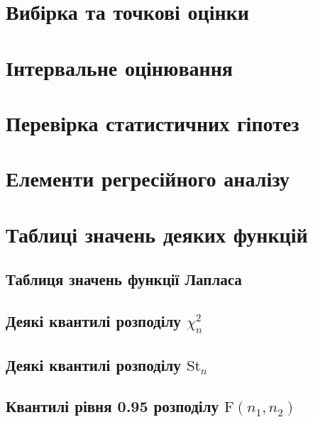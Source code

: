\documentclass{report}
\begin{document}
    \chapter{Вибірка та точкові оцінки}
        
        
    \chapter{Інтервальне оцінювання}
    \chapter{Перевірка статистичних гіпотез}
    \chapter{Елементи регресійного аналізу}
    \chapter*{Таблиці значень деяких функцій}
    \section*{Таблиця значень функції Лапласа}
        \newpage
    \section*{Деякі квантилі розподілу $\chi^2_{n}$}
        \newpage
    \section*{Деякі квантилі розподілу $\mathrm{St}_n$}
        \newpage
    \section*{Квантилі рівня 0.95 розподілу $\mathrm{F}(n_1, n_2)$}
        \newpage
\end{document}
